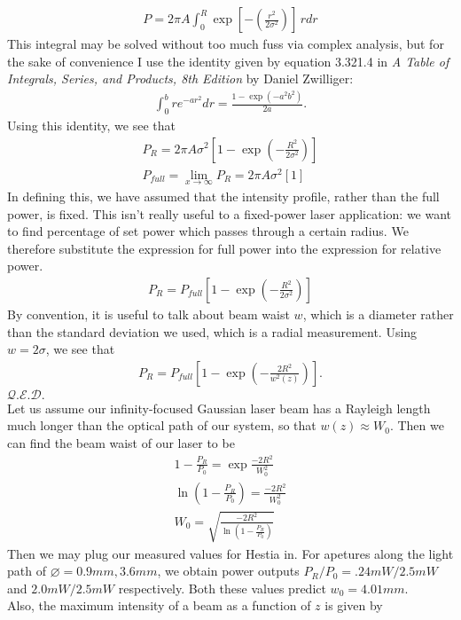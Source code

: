 \begin{gather}
       P = 2\pi A \int^{R}_{0} \exp \left[-\left(\frac{r^2}{2\sigma^2}\right)\right] \, r dr
\end{gather}
This integral may be solved without too much fuss via complex analysis, but for the sake of convenience I use the identity given by equation 3.321.4 in \textit{A Table of Integrals, Series, and Products, 8th Edition} by Daniel Zwilliger:
\begin{gather}
    \int^b_0 r e^{-ar^2} dr = \frac{1-\exp\left(-a^2b^2\right)}{2a}.
\end{gather}
Using this identity, we see that
\begin{gather}
    P_R = 2\pi A \sigma^2 \left[ 1-\exp(-\frac{R^2}{2\sigma^2})\right]\\
    P_{full} = \lim_{x\to\infty} P_R  = 2\pi A \sigma^2 [1]
\end{gather}
In defining this, we have assumed that the intensity profile, rather than the full power, is fixed. This isn't really useful to a fixed-power laser application: we want to find percentage of set power which passes through a certain radius. We therefore substitute the expression for full power into the expression for relative power.
\begin{gather}
     P_R = P_{full} \left[ 1-\exp\left(-\frac{R^2}{2\sigma^2}\right)\right]
\end{gather}
By convention, it is useful to talk about beam waist $w$, which is a diameter rather than the standard deviation we used, which is a radial measurement. Using $w=2\sigma$, we see that
\begin{gather}
    P_R = P_{full} \left[ 1-\exp\left(-\frac{2R^2}{w^2(z)}\right)\right].
\end{gather}
$\mathcal{Q}.\mathcal{E}.\mathcal{D}.$\\
Let us assume our infinity-focused Gaussian laser beam has a Rayleigh length much longer than the optical path of our system, so that $w(z)\approx W_0$. Then we can find the beam waist of our laser to be
\begin{gather}
    1-\frac{P_R}{P_0} = \exp{\frac{-2R^2}{W_0^2}}\\
    \ln{\left( 1-\frac{P_R}{P_0}\right)}=\frac{-2R^2}{W_0^2}\\
    W_0 = \sqrt{\frac{-2R^2}{\ln{\left( 1-\frac{P_R}{P_0}\right)}}}
\end{gather}
Then we may plug our measured values for Hestia in. For apetures along the light path of $\diameter = 0.9mm, 3.6mm$, we obtain power outputs $P_R/P_0 =  .24mW/2.5mW$ and $2.0mW/2.5mW$ respectively. Both these values predict $w_0=4.01mm$.\\
Also, the maximum intensity of a beam as a function of $z$ is given by \\
